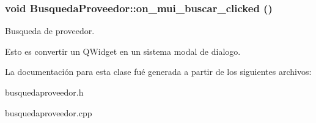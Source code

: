 \subsubsection{\setlength{\rightskip}{0pt plus 5cm}void Busqueda\-Proveedor::on\_\-mui\_\-buscar\_\-clicked ()\hspace{0.3cm}{\tt  [virtual, slot]}}\label{classBusquedaProveedor_i2}


Busqueda de proveedor. 

Esto es convertir un QWidget en un sistema modal de dialogo. 

La documentaci\'{o}n para esta clase fu\'{e} generada a partir de los siguientes archivos:\begin{CompactItemize}
\item 
busquedaproveedor.h\item 
busquedaproveedor.cpp\end{CompactItemize}
